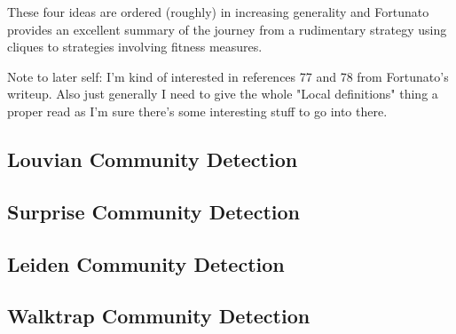 These four ideas are ordered (roughly) in increasing generality and Fortunato provides an excellent summary of the journey from a rudimentary strategy using cliques to strategies involving fitness measures.\cite[84-85]{fortunato}

Note to later self: I'm kind of interested in references 77 and 78 from Fortunato's writeup. Also just generally I need to give the whole "Local definitions" thing a proper read as I'm sure there's some interesting stuff to go into there.


%


\subsection{Louvian Community Detection}

\subsection{Surprise Community Detection}

\subsection{Leiden Community Detection}

\subsection{Walktrap Community Detection}
